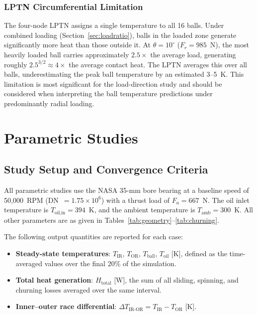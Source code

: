 \documentclass[applsci,article,submit,pdftex,moreauthors]{Definitions/mdpi}
\begin{document}
\subsubsection{LPTN Circumferential Limitation}
\label{sec:lptn_limit}

The four-node LPTN assigns a single temperature to all 16 balls. Under combined loading (Section~\ref{sec:loadratio}), balls in the loaded zone generate significantly more heat than those outside it. At $\theta = 10^\circ$ ($F_r = 985$~N), the most heavily loaded ball carries approximately $2.5\times$ the average load, generating roughly $2.5^{3/2} \approx 4\times$ the average contact heat. The LPTN averages this over all balls, underestimating the peak ball temperature by an estimated 3--5~K. This limitation is most significant for the load-direction study and should be considered when interpreting the ball temperature predictions under predominantly radial loading.


\section{Parametric Studies}
\label{sec:parametric}

\subsection{Study Setup and Convergence Criteria}
\label{sec:setup}

All parametric studies use the NASA 35-mm bore bearing at a baseline speed of 50,000~RPM (DN~$= 1.75 \times 10^6$) with a thrust load of $F_a = 667$~N. The oil inlet temperature is $T_{\text{oil,in}} = 394$~K, and the ambient temperature is $T_{\text{amb}} = 300$~K. All other parameters are as given in Tables~\ref{tab:geometry}--\ref{tab:churning}.

The following output quantities are reported for each case:
\begin{itemize}
    \item \textbf{Steady-state temperatures}: $T_{\text{IR}}$, $T_{\text{OR}}$, $T_{\text{ball}}$, $T_{\text{oil}}$ [K], defined as the time-averaged values over the final 20\% of the simulation.
    \item \textbf{Total heat generation}: $H_{\text{total}}$ [W], the sum of all sliding, spinning, and churning losses averaged over the same interval.
    \item \textbf{Inner--outer race differential}: $\Delta T_{\text{IR-OR}} = T_{\text{IR}} - T_{\text{OR}}$ [K].
\end{itemize}
\end{document}
